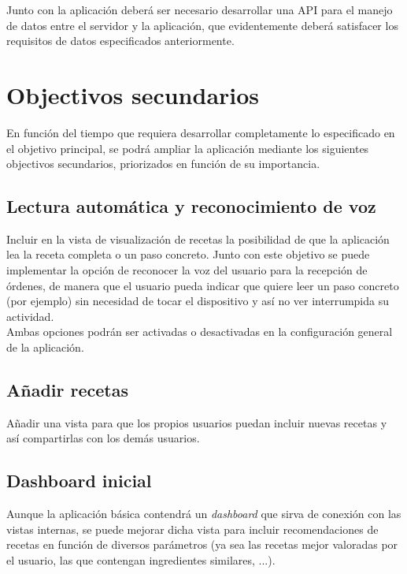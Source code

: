 \documentclass[a4paper,11pt]{article}
\begin{document}
Junto con la aplicación deberá ser necesario desarrollar una API para el manejo de datos entre el servidor y la aplicación, que evidentemente deberá satisfacer los requisitos de datos especificados anteriormente.

\section{Objectivos secundarios}

En función del tiempo que requiera desarrollar completamente lo especificado en el objetivo principal, se podrá ampliar la aplicación mediante los siguientes objectivos secundarios, priorizados en función de su importancia.

\subsection{Lectura automática y reconocimiento de voz}

Incluir en la vista de visualización de recetas la posibilidad de que la aplicación lea la receta completa o un paso concreto. Junto con este objetivo se puede implementar la opción de reconocer la voz del usuario para la recepción de órdenes, de manera que el usuario pueda indicar que quiere leer un paso concreto (por ejemplo) sin necesidad de tocar el dispositivo y así no ver interrumpida su actividad.\\

Ambas opciones podrán ser activadas o desactivadas en la configuración general de la aplicación.


\subsection{Añadir recetas}

Añadir una vista para que los propios usuarios puedan incluir nuevas recetas y así compartirlas con los demás usuarios.


\subsection{Dashboard inicial}

Aunque la aplicación básica contendrá un \textit{dashboard} que sirva de conexión con las vistas internas, se puede mejorar dicha vista para incluir recomendaciones de recetas en función de diversos parámetros (ya sea las recetas mejor valoradas por el usuario, las que contengan ingredientes similares, ...).\\
\end{document}
